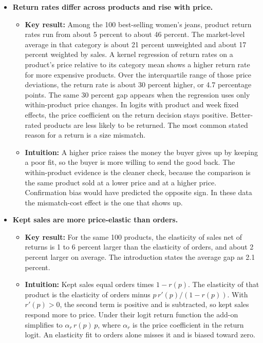 \documentclass[11pt]{article}
\begin{document}
\begin{itemize}
    \item \textbf{Return rates differ across products and rise with price.}
    \begin{itemize}
        \item \textbf{Key result:} Among the 100 best-selling women's jeans, product return rates run from about 5 percent to about 46 percent. The market-level average in that category is about 21 percent unweighted and about 17 percent weighted by sales. A kernel regression of return rates on a product's price relative to its category mean shows a higher return rate for more expensive products. Over the interquartile range of those price deviations, the return rate is about 30 percent higher, or 4.7 percentage points. The same 30 percent gap appears when the regression uses only within-product price changes. In logits with product and week fixed effects, the price coefficient on the return decision stays positive. Better-rated products are less likely to be returned. The most common stated reason for a return is a size mismatch.
        \item \textbf{Intuition:} A higher price raises the money the buyer gives up by keeping a poor fit, so the buyer is more willing to send the good back. The within-product evidence is the cleaner check, because the comparison is the same product sold at a lower price and at a higher price. Confirmation bias would have predicted the opposite sign. In these data the mismatch-cost effect is the one that shows up.
    \end{itemize}

    \item \textbf{Kept sales are more price-elastic than orders.}
    \begin{itemize}
        \item \textbf{Key result:} For the same 100 products, the elasticity of sales net of returns is 1 to 6 percent larger than the elasticity of orders, and about 2 percent larger on average. The introduction states the average gap as 2.1 percent.
        \item \textbf{Intuition:} Kept sales equal orders times \(1-r(p)\). The elasticity of that product is the elasticity of orders minus \(p\,r'(p)/(1-r(p))\). With \(r'(p)>0\), the second term is positive and is subtracted, so kept sales respond more to price. Under their logit return function the add-on simplifies to \(\alpha_r\, r(p)\, p\), where \(\alpha_r\) is the price coefficient in the return logit. An elasticity fit to orders alone misses it and is biased toward zero.
    \end{itemize}


\end{itemize}
\end{document}
